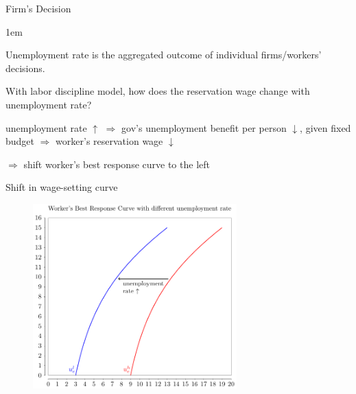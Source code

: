 \documentclass[11pt,aspectratio=43,usenames,dvipsnames]{beamer}
\let\olditemize=\itemize
\let\endolditemize=\enditemize
\renewenvironment{itemize}{\olditemize \itemsep1em}{\endolditemize}
\theoremstyle{definition}
\begin{document}
\begin{frame}{Firm's Decision}
\label{slide:Firm_s_Decision}

\begin{itemize}
    \item Unemployment rate is the aggregated outcome of individual firms/workers' decisions.
    \item With labor discipline model, how does the reservation wage change with unemployment rate?
    \item \alert{unemployment rate $ \uparrow  $} $ \Rightarrow  $ gov's unemployment benefit per person $ \downarrow  $, given fixed budget $ \Rightarrow  $ \alert{worker's reservation wage $ \downarrow  $}
    \item $ \Rightarrow  $ shift worker's best response curve to the \alert{left}
\end{itemize}
\end{frame}

\begin{frame}{Shift in wage-setting curve}
\label{slide:Shift_in_wage_setting_curve}
    \begin{figure}
        \centering
        \includegraphics[width=0.7\textwidth]{../Unit6FirmLaborMarket/figures/BestResponse}
    \end{figure}

\end{frame}
\end{document}

